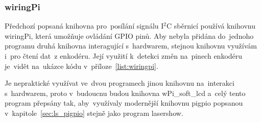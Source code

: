 
\subsubsection{wiringPi}
Předchozí popsaná knihovna pro~posílání signálu I$^{2}$C sběrnicí používá knihovnu wiringPi, která umožňuje ovládání GPIO pinů. Aby nebyla přidána  do~jednoho programu druhá knihovna interagující s~hardwarem, stejnou knihovnu využívám i~pro čtení dat~z enkodéru. Její využití k~detekci změn na~pinech enkodéru je~vidět na~ukázce kódu v~příloze~\ref{list:wiringpi}.

Je nepraktické využívat ve~dvou programech jinou knihovnu na~interakci s~hardwarem, proto v~budoucnu budou knihovna wPi\_soft\_lcd a~celý tento program přepsány tak, aby~využívaly modernější knihovnu pigpio popsanou v~kapitole~\ref{sec:ls_pigpio} stejně jako program lasershow.


